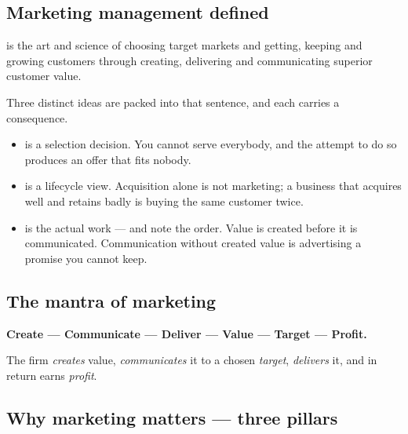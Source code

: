 \documentclass{MMTextbook}
\begin{document}
\subsection{Marketing management defined}

\begin{definitionbox}
 is the art and science of choosing target
markets and getting, keeping and growing customers through creating, delivering
and communicating superior customer value.
\end{definitionbox}

Three distinct ideas are packed into that sentence, and each carries a
consequence.

\begin{itemize}
\item {} is a selection decision. You cannot serve
      everybody, and the attempt to do so produces an offer that fits nobody.
\item {} is a lifecycle view.
      Acquisition alone is not marketing; a business that acquires well and
      retains badly is buying the same customer twice.
\item {} is the
      actual work --- and note the order. Value is created before it is
      communicated. Communication without created value is advertising a
      promise you cannot keep.
\end{itemize}

\subsection{The mantra of marketing}

\begin{exambox}
\textbf{Create --- Communicate --- Deliver --- Value --- Target --- Profit.}

\smallskip
The firm \emph{creates} value, \emph{communicates} it to a chosen
\emph{target}, \emph{delivers} it, and in return earns \emph{profit}.
\end{exambox}

\subsection{Why marketing matters --- three pillars}
\end{document}
